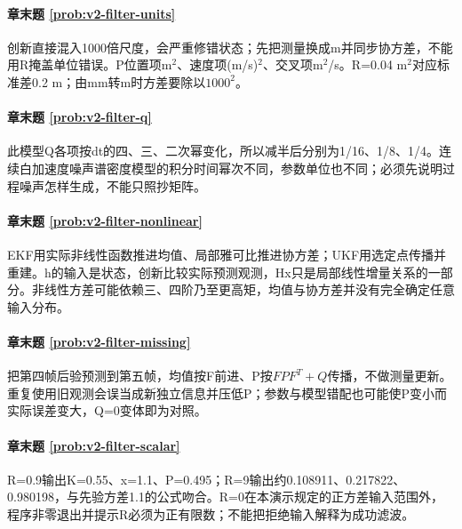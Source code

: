 \paragraph*{章末题 \ref{prob:v2-filter-units}}
\begin{solution}
创新直接混入1000倍尺度，会严重修错状态；先把测量换成m并同步协方差，不能用R掩盖单位错误。P位置项m$^2$、速度项(m/s)$^2$、交叉项m$^2$/s。R=0.04 m$^2$对应标准差0.2 m；由mm转m时方差要除以$1000^2$。
\end{solution}

\paragraph*{章末题 \ref{prob:v2-filter-q}}
\begin{solution}
此模型Q各项按dt的四、三、二次幂变化，所以减半后分别为1/16、1/8、1/4。连续白加速度噪声谱密度模型的积分时间幂次不同，参数单位也不同；必须先说明过程噪声怎样生成，不能只照抄矩阵。
\end{solution}

\paragraph*{章末题 \ref{prob:v2-filter-nonlinear}}
\begin{solution}
EKF用实际非线性函数推进均值、局部雅可比推进协方差；UKF用选定点传播并重建。h的输入是状态，创新比较实际预测观测，Hx只是局部线性增量关系的一部分。非线性方差可能依赖三、四阶乃至更高矩，均值与协方差并没有完全确定任意输入分布。
\end{solution}

\paragraph*{章末题 \ref{prob:v2-filter-missing}}
\begin{solution}
把第四帧后验预测到第五帧，均值按F前进、P按$FPF^T+Q$传播，不做测量更新。重复使用旧观测会误当成新独立信息并压低P；参数与模型错配也可能使P变小而实际误差变大，Q=0变体即为对照。
\end{solution}

\paragraph*{章末题 \ref{prob:v2-filter-scalar}}
\begin{solution}
R=0.9输出K=0.55、x=1.1、P=0.495；R=9输出约0.108911、0.217822、0.980198，与先验方差1.1的公式吻合。R=0在本演示规定的正方差输入范围外，程序非零退出并提示R必须为正有限数；不能把拒绝输入解释为成功滤波。
\end{solution}

